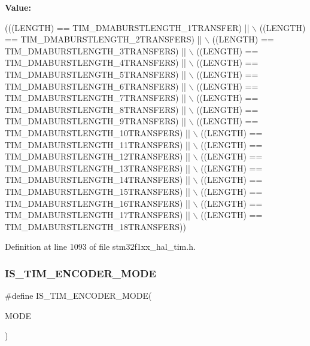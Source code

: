 {\bfseries Value\+:}
\begin{DoxyCode}
(((LENGTH) == TIM\_DMABURSTLENGTH\_1TRANSFER)   || \(\backslash\)
                                   ((LENGTH) == TIM\_DMABURSTLENGTH\_2TRANSFERS)  || \(\backslash\)
                                   ((LENGTH) == TIM\_DMABURSTLENGTH\_3TRANSFERS)  || \(\backslash\)
                                   ((LENGTH) == TIM\_DMABURSTLENGTH\_4TRANSFERS)  || \(\backslash\)
                                   ((LENGTH) == TIM\_DMABURSTLENGTH\_5TRANSFERS)  || \(\backslash\)
                                   ((LENGTH) == TIM\_DMABURSTLENGTH\_6TRANSFERS)  || \(\backslash\)
                                   ((LENGTH) == TIM\_DMABURSTLENGTH\_7TRANSFERS)  || \(\backslash\)
                                   ((LENGTH) == TIM\_DMABURSTLENGTH\_8TRANSFERS)  || \(\backslash\)
                                   ((LENGTH) == TIM\_DMABURSTLENGTH\_9TRANSFERS)  || \(\backslash\)
                                   ((LENGTH) == TIM\_DMABURSTLENGTH\_10TRANSFERS) || \(\backslash\)
                                   ((LENGTH) == TIM\_DMABURSTLENGTH\_11TRANSFERS) || \(\backslash\)
                                   ((LENGTH) == TIM\_DMABURSTLENGTH\_12TRANSFERS) || \(\backslash\)
                                   ((LENGTH) == TIM\_DMABURSTLENGTH\_13TRANSFERS) || \(\backslash\)
                                   ((LENGTH) == TIM\_DMABURSTLENGTH\_14TRANSFERS) || \(\backslash\)
                                   ((LENGTH) == TIM\_DMABURSTLENGTH\_15TRANSFERS) || \(\backslash\)
                                   ((LENGTH) == TIM\_DMABURSTLENGTH\_16TRANSFERS) || \(\backslash\)
                                   ((LENGTH) == TIM\_DMABURSTLENGTH\_17TRANSFERS) || \(\backslash\)
                                   ((LENGTH) == TIM\_DMABURSTLENGTH\_18TRANSFERS))
\end{DoxyCode}


Definition at line 1093 of file stm32f1xx\+\_\+hal\+\_\+tim.\+h.

\mbox{\label{group___t_i_m___private___macros_ga9dd5baa6b2a44e0f25068a650cbfdd1b}} 
\subsubsection{\texorpdfstring{I\+S\+\_\+\+T\+I\+M\+\_\+\+E\+N\+C\+O\+D\+E\+R\+\_\+\+M\+O\+DE}{IS\_TIM\_ENCODER\_MODE}}
{\footnotesize\ttfamily \#define I\+S\+\_\+\+T\+I\+M\+\_\+\+E\+N\+C\+O\+D\+E\+R\+\_\+\+M\+O\+DE(\begin{DoxyParamCaption}\item[{}]{M\+O\+DE }\end{DoxyParamCaption})}

